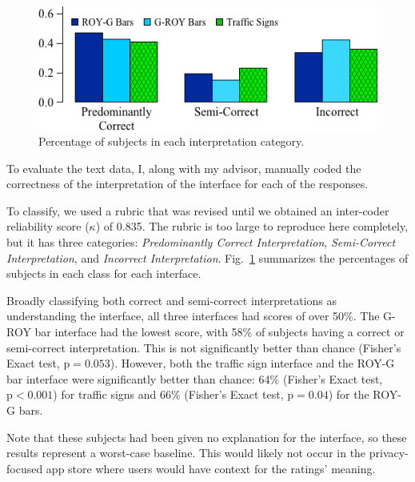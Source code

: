 \documentclass[11pt]{article}
\begin{document}
\begin{figure}
\begin{center}
\includegraphics[width=.9\linewidth]{graphs/InterpPercentages.png}
    \caption{Percentage of subjects in each interpretation category.}
    \label{text-cat}
\end{center}
\end{figure}

To evaluate the text data, I, along with my advisor, manually coded  the correctness
of the interpretation of the interface for each of 
the responses.

To classify, we used a rubric that was revised until we obtained an
inter-coder reliability score ($\kappa$) of 0.835. 
The rubric is too large to reproduce here completely, but it has three
categories: \emph{Predominantly Correct Interpretation},
\emph{Semi-Correct Interpretation}, and \emph{Incorrect Interpretation}.
Fig.~\ref{text-cat} summarizes the percentages of subjects in
each class for each interface.




Broadly classifying both correct and semi-correct
interpretations as understanding the interface,
all three interfaces had scores of over 50\%. 
The G-ROY bar interface had the lowest 
score, with 58\% of 
subjects having a correct or semi-correct interpretation. This is not significantly better 
than chance (Fisher's Exact test, $\mathrm{p}=0.053$). However, both the traffic 
sign interface and the ROY-G bar interface were 
significantly better than chance:
64\% (Fisher's Exact test, $\mathrm{p}<0.001$) for traffic signs and
66\% (Fisher's Exact test, $\mathrm{p}=0.04$) for the ROY-G bars. 

Note that these subjects had been given no explanation for the
interface, so these results represent a worst-case baseline. 
This would likely not occur in
the privacy-focused app store where users would have 
context for the ratings' meaning.
\end{document}
